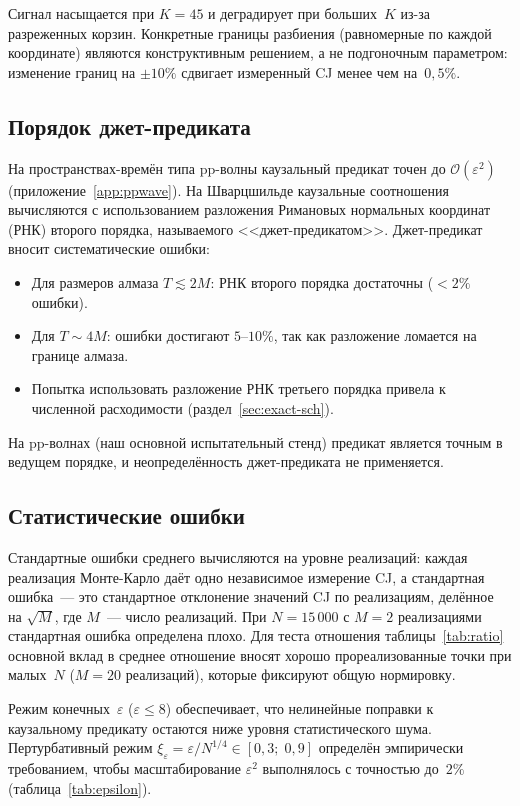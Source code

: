 \documentclass[12pt,a4paper]{article}
\theoremstyle{plain}
\theoremstyle{definition}
\theoremstyle{remark}
\newcommand{\order}{\mathcal{O}}
\begin{document}
Сигнал насыщается при $K = 45$ и деградирует при больших~$K$
из-за разреженных корзин.  Конкретные границы разбиения
(равномерные по каждой координате) являются конструктивным
решением, а не подгоночным параметром: изменение границ на
$\pm 10\%$ сдвигает измеренный CJ менее чем на~$0{,}5\%$.

\subsection{Порядок джет-предиката}
\label{sec:jet-order}

На пространствах-времён типа pp-волны каузальный предикат
точен до $\order(\varepsilon^2)$
(приложение~\ref{app:ppwave}).  На Шварцшильде каузальные
соотношения вычисляются с использованием разложения
Римановых нормальных координат (РНК) второго порядка,
называемого <<джет-предикатом>>.  Джет-предикат вносит
систематические ошибки:
\begin{itemize}
\item Для размеров алмаза $T \lesssim 2M$: РНК второго
  порядка достаточны ($< 2\%$ ошибки).
\item Для $T \sim 4M$: ошибки достигают $5$--$10\%$, так как
  разложение ломается на границе алмаза.
\item Попытка использовать разложение РНК третьего порядка
  привела к численной расходимости
  (раздел~\ref{sec:exact-sch}).
\end{itemize}
На pp-волнах (наш основной испытательный стенд) предикат
является точным в ведущем порядке, и неопределённость
джет-предиката не применяется.

\subsection{Статистические ошибки}
\label{sec:stat-errors}

Стандартные ошибки среднего вычисляются на уровне
реализаций: каждая реализация Монте-Карло даёт одно
независимое измерение CJ, а стандартная ошибка~--- это
стандартное отклонение значений CJ по реализациям, делённое
на $\sqrt{M}$, где $M$~--- число реализаций.  При
$N = 15\,000$ с $M = 2$ реализациями стандартная ошибка
определена плохо.  Для теста отношения
таблицы~\ref{tab:ratio} основной вклад в среднее отношение
вносят хорошо прореализованные точки при малых~$N$
($M = 20$ реализаций), которые фиксируют общую нормировку.

Режим конечных~$\varepsilon$ ($\varepsilon \leq 8$)
обеспечивает, что нелинейные поправки к каузальному предикату
остаются ниже уровня статистического шума.
Пертурбативный режим
$\xi_\varepsilon = \varepsilon / N^{1/4} \in [0{,}3;\; 0{,}9]$
определён эмпирически требованием, чтобы масштабирование
$\varepsilon^2$ выполнялось с точностью до~$2\%$
(таблица~\ref{tab:epsilon}).
\end{document}
